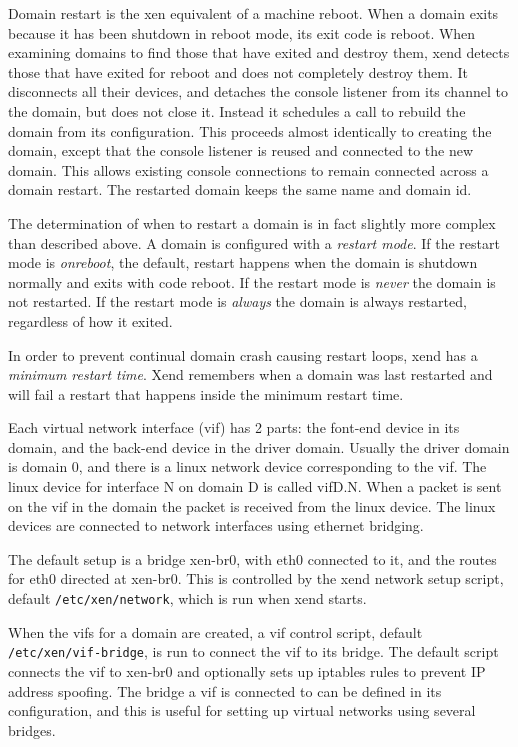 \documentclass[11pt,twoside,final,openright]{xenstyle}
\begin{document}
Domain restart is the xen equivalent of a machine reboot. When a domain
exits because it has been shutdown in reboot mode, its exit code is reboot.
When examining domains to find those that have exited and destroy them,
xend detects those that have exited for reboot and does not completely destroy
them. It disconnects all their devices, and detaches the console listener
from its channel to the domain, but does not close it. Instead it schedules
a call to rebuild the domain from its configuration. This proceeds almost
identically to creating the domain, except that the console listener is
reused and connected to the new domain. This allows existing console
connections to remain connected across a domain restart. The restarted
domain keeps the same name and domain id.

The determination of when to restart a domain is in fact slightly more
complex than described above. A domain is configured with a 
{\em restart mode}. If the restart mode is {\em onreboot}, the default,
restart happens when the domain is shutdown normally and
exits with code reboot. If the restart mode is {\em never} the domain is
not restarted. If the restart mode is {\em always} the domain is always
restarted, regardless of how it exited.

In order to prevent continual domain crash causing restart loops, xend
has a {\em minimum restart time}. Xend remembers when a domain was last
restarted and will fail a restart that happens inside the minimum
restart time.

Each virtual network interface (vif) has 2 parts: the font-end device in its domain,
and the back-end device in the driver domain. Usually the driver domain is domain 0,
and there is a linux network device corresponding to the vif. The linux device for
interface N on domain D is called vifD.N. When a packet is sent on the vif in the 
domain the packet is received from the linux device. The linux devices are connected
to network interfaces using ethernet bridging.

The default setup is a bridge xen-br0, with eth0 connected to it, and the routes
for eth0 directed at xen-br0. This is controlled by the xend network setup script,
default {\tt /etc/xen/network}, which is run when xend starts.

When the vifs for a domain are created, a vif control script, default {\tt /etc/xen/vif-bridge},
is run to connect the vif to its bridge. The default script connects the vif
to xen-br0 and optionally sets up iptables rules to prevent IP address spoofing.
The bridge a vif is connected to can be defined in its configuration, and this is useful
for setting up virtual networks using several bridges.
\end{document}
